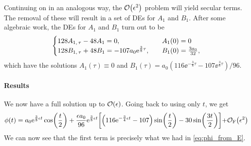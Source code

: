 Continuing on in an analogous way, the $\order{\epsilon^2}$ problem
will yield secular terms. The removal of these will result in a set of
DEs for $A_1$ and $B_1$. 
After some algebraic work, the DEs for $A_1$ and $B_1$ turn out to be
\begin{equation}
\begin{cases}
128A_{1,\,\tau}-48A_1=0\qcomma&A_1(0)=0\\
128B_{1,\,\tau}+48B_1=-107a_0\ee^{\frac{3}{8}\tau}\qcomma&B_1(0)=\frac{3a_0}{32},
\end{cases}
\end{equation}
which have the solutions $A_1(\tau)\equiv0$ and
$B_1(\tau)=a_0(116\ee^{-\frac{3}{8}\tau}-107\ee^{\frac{3}{8}\tau})/96$.


\paragraph{Results}
We now have a full solution up to $\order{\epsilon}$.
Going back to using only $t$, we get
\begin{equation}
\phi(t)=a_0\mathrm{e}^{\frac{3}{8}\epsilon{t}}\cos(\frac{t}{2})
+\frac{\epsilon a_0}{96}\mathrm{e}^{\frac{3}{8}\epsilon{t}}\qty[
\qty(116\mathrm{e}^{-\frac{3}{4}\epsilon{t}}-107)
\sin(\frac{t}{2})
-30\sin(\frac{3t}{2})]
{+}\mathcal{O}_\text{F}\qty(\epsilon^2)
\end{equation}
We can now see that the first term is precisely what we had in
\eqref{eq:phi_from_E}. 



